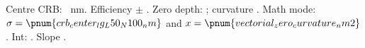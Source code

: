 \documentclass{article}
\newcommand{\src}[1]{}
\begin{document}
Centre CRB: \src{crb_center_lg_L50_N100_nm}~nm.
Efficiency  $\pm$ .
Zero depth: ; curvature .
Math mode: $\sigma = \pnum{crb_center_lg_L50_N100_nm}$ and $x=\pnum{vectorial_zero_curvature_nm2}$.
Int: . Slope .
\end{document}
